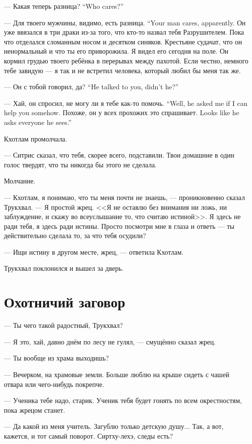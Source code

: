 {--- Какая теперь разница?}
{``Who cares?''}

{--- Для твоего мужчины, видимо, есть разница.}
{``Your man cares, apparently.}
Он уже ввязался в три драки из-за того, что кто-то назвал тебя Разрушителем.
Пока что отделался сломанным носом и десятком синяков.
Крестьяне судачат, что он ненормальный и что ты его приворожила.
Я видел его сегодня на поле.
Он кормил грудью твоего ребёнка в перерывах между пахотой.
Если честно, немного тебе завидую --- я так и не встретил человека, который любил бы меня так же.

{--- Он с тобой говорил, да?}
{``He talked to you, didn't he?''}

{--- Хай, он спросил, не могу ли я тебе как-то помочь.}
{``Well, he asked me if I can help you somehow.}
{Похоже, он у всех прохожих это спрашивает.}
{Looks like he asks everyone he sees.''}

Кхотлам промолчала.

--- Ситрис сказал, что тебя, скорее всего, подставили.
Твои домашние в один голос твердят, что ты никогда бы этого не сделала.

Молчание.

--- Кхотлам, я понимаю, что ты меня почти не знаешь, --- проникновенно сказал Трукхвал.
--- Я простой жрец.
<<Я не оставлю без внимания ни ложь, ни заблуждение, и скажу во всеуслышание то, что считаю истиной>>.
Я здесь не ради тебя, я здесь ради истины.
Просто посмотри мне в глаза и ответь --- ты действительно сделала то, за что тебя осудили?

--- Ищи истину в другом месте, жрец, --- ответила Кхотлам.

Трукхвал поклонился и вышел за дверь.

\section{Охотничий заговор}

--- Ты чего такой радостный, Трукхвал?

--- Я это, хай, давно днём по лесу не гулял, --- смущённо сказал жрец.

--- Ты вообще из храма выходишь?

--- Вечерком, на храмовые земли.
Больше люблю на крыше сидеть с чашей отвара или чего-нибудь покрепче.

--- Ученика тебе надо, старик.
Ученик тебя будет гонять по всем окрестностям, пока жрецом станет.

--- Да какой из меня учитель.
Загублю только детскую душу...
Так, а вот, кажется, и тот самый поворот.
Сиртху-лехэ, следы есть?


